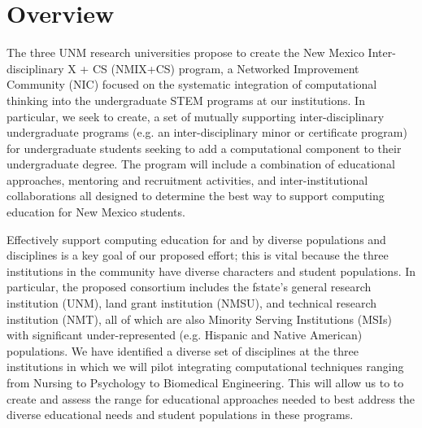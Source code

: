 \section{Overview}
\label{sec:overview}

The three UNM research universities propose to create the New Mexico Inter-disciplinary X + CS (NMIX+CS) program, a Networked Improvement Community (NIC) focused on the systematic integration of computational thinking into the undergraduate STEM programs at our institutions. In particular, we seek to create,
a set of mutually supporting inter-disciplinary undergraduate programs (e.g. an inter-disciplinary minor or
certificate program) for undergraduate students seeking to add a computational component to their undergraduate
degree. The program will include a combination of educational approaches, mentoring and recruitment activities, and inter-institutional collaborations all designed to determine the best way to support computing education for New Mexico students.

Effectively support computing education for and by diverse populations
and disciplines is a key goal of our proposed effort; this is vital because the three institutions in the community have diverse
characters and student populations. In particular, the proposed consortium includes the fstate's general research institution (UNM), land grant institution (NMSU), and technical research institution (NMT), all of which
are also Minority Serving Institutions (MSIs) with significant under-represented (e.g. Hispanic
and Native American) populations. We have identified a diverse set of disciplines at the three institutions in which we will pilot integrating computational techniques ranging from Nursing to Psychology to Biomedical Engineering. This will allow us to to create and assess the range for  educational approaches needed to best address the diverse educational needs and student populations in these programs.

